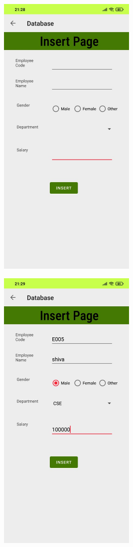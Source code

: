 \documentclass[12pt,letterpaper]{article}
\begin{document}
\newpage
\subsubsection*{}
\begin{figure}[h]
    \centering
    \includegraphics[height=14cm, keepaspectratio]{Outputs/OP3.png}
\end{figure}
\begin{figure}
    \centering
    \includegraphics[height=14cm, keepaspectratio]{Outputs/OP4.png}
\end{figure}
\end{document}
